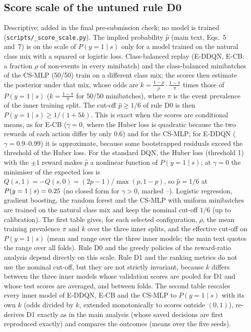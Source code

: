 \subsection{Score scale of the untuned rule D0}
\label{sec:s-scorescale}
Descriptive; added in the final pre-submission check; no model is trained (\texttt{scripts/\_score\_scale.py}). The implied probability $\hat p$ (main text, Eqs.~5 and~7) is on the scale of $P(y=1\mid s)$ only for a model trained on the natural class mix with a squared or logistic loss. Class-balanced replay (E-DDQN, E-CB: a fraction $\rho$ of non-events in every minibatch) and the class-balanced minibatches of the CS-MLP (50/50) train on a different class mix; the scores then estimate the posterior under that mix, whose odds are $k=\frac{1-\rho}{\rho}\cdot\frac{1-\pi}{\pi}$ times those of $P(y=1\mid s)$ ($k=\frac{1-\pi}{\pi}$ for 50/50 minibatches), where $\pi$ is the event prevalence of the inner training split. The cut-off $\hat p\ge 1/6$ of rule D0 is then $P(y=1\mid s)\ge 1/(1+5k)$. This is exact when the scores are conditional means, as for E-CB ($\gamma=0$, where the Huber loss is quadratic because the two rewards of each action differ by only 0.6) and for the CS-MLP; for E-DDQN ($\gamma=0.9$--0.99) it is approximate, because some bootstrapped residuals exceed the threshold of the Huber loss. For the standard DQN, the Huber loss (threshold 1) with the $\pm1$ reward makes $\hat p$ a nonlinear function of $P(y=1\mid s)$; at $\gamma=0$ the minimiser of the expected loss is $Q(s,1)=-Q(s,0)=(2p-1)/\max(p,1-p)$, so $\hat p=1/6$ at $P(y=1\mid s)=0.25$ (no closed form for $\gamma>0$, marked --). Logistic regression, gradient boosting, the random forest and the CS-MLP with uniform minibatches are trained on the natural class mix and keep the nominal cut-off $1/6$ (up to calibration). The first table gives, for each selected configuration, $\rho$, the mean training prevalence $\pi$ and $k$ over the three inner splits, and the effective cut-off on $P(y=1\mid s)$ (mean and range over the three inner models; the main text quotes the range over all folds). Rule D0 and the greedy policies of the reward-ratio analysis depend directly on this scale. Rule D1 and the ranking metrics do not use the nominal cut-off, but they are not strictly invariant, because $k$ differs between the three inner models whose validation scores are pooled for D1 and whose test scores are averaged, and between folds. The second table rescales every inner model of E-DDQN, E-CB and the CS-MLP to $P(y=1\mid s)$ with its own $k$ (odds divided by $k$, extended monotonically to scores outside $(0,1)$), re-derives D1 exactly as in the main analysis (whose saved decisions are first reproduced exactly) and compares the outcomes (means over the five seeds).

\begin{center}\footnotesize
\resizebox{\textwidth}{!}{}
\end{center}

\begin{center}\footnotesize
\resizebox{\textwidth}{!}{}
\end{center}
